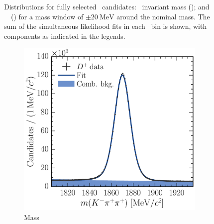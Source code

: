 \begin{figure}
\begin{subfigure}[b]{0.5\textwidth}
    \caption{\lnipchisq}
    \label{fig:prod:fitting:D0ToKpi:ipchisq}
  \end{subfigure}
  \caption{%
    Distributions for fully selected \DzToKpi\ candidates: \PDzero\ invariant 
    mass (); and \PDzero\ \lnipchisq\ 
    () for a mass window of 
    $\pm\SI{20}{\MeV}$ around the nominal \PDzero mass.
    The sum of the simultaneous likelihood fits in each \pTy\ bin is shown, 
    with components as indicated in the legends.
  }
  \label{fig:prod:fitting:D0ToKpi}
\end{figure}

\begin{figure}
  \begin{subfigure}[b]{0.5\textwidth}
    \centering
    \includegraphics[width=\textwidth]{figures/production/fitting/DpToKpipi_mass_fit_pT_integrated_y_integrated}
    \caption{Mass}
    \label{fig:prod:fitting:DpToKpipi:mass}
  \end{subfigure}
  \begin{subfigure}[b]{0.5\textwidth}
    \centering

\end{subfigure}
\end{figure}
